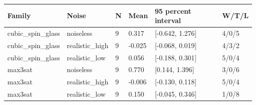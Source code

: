 \begin{tabular}{llllll}
\hline
Family & Noise & N & Mean & 95 percent interval & W/T/L \\
\hline
cubic\_spin\_glass & noiseless & 9 & 0.317 & [-0.642, 1.276] & 4/0/5 \\
cubic\_spin\_glass & realistic\_high & 9 & -0.025 & [-0.068, 0.019] & 4/3/2 \\
cubic\_spin\_glass & realistic\_low & 9 & 0.056 & [-0.188, 0.301] & 5/0/4 \\
max3sat & noiseless & 9 & 0.770 & [0.144, 1.396] & 3/0/6 \\
max3sat & realistic\_high & 9 & -0.006 & [-0.130, 0.118] & 5/0/4 \\
max3sat & realistic\_low & 9 & 0.150 & [-0.045, 0.346] & 1/0/8 \\
\hline
\end{tabular}
